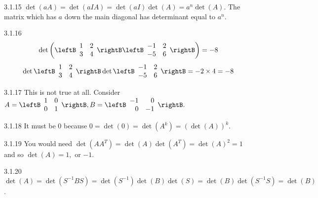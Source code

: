 \begin{Answer}{3.1.15}
$\det \left( aA\right) =\det
\left( aIA\right) =\det \left( aI\right) \det \left( A\right) =a^{n}\det
\left( A\right) .$ The matrix which has $a$ down the main diagonal has
determinant equal to $a^{n}$.
\end{Answer}
\begin{Answer}{3.1.16}
\[
\det
\left( \leftB
\begin{array}{cc}
1 & 2 \\
3 & 4
\end{array}
\rightB \leftB
\begin{array}{rr}
-1 & 2 \\
-5 & 6
\end{array}
\rightB \right) = -8
\]
\[
\det \leftB
\begin{array}{cc}
1 & 2 \\
3 & 4
\end{array}
\rightB \det \leftB
\begin{array}{rr}
-1 & 2 \\
-5 & 6
\end{array}
\rightB = -2 \times 4 = -8
\]
\end{Answer}
\begin{Answer}{3.1.17}
This is not true at all. Consider $A=\leftB
\begin{array}{cc}
1 & 0 \\
0 & 1
\end{array}
\rightB ,B=\leftB
\begin{array}{rr}
-1 & 0 \\
0 & -1
\end{array}
\rightB .$
\end{Answer}
\begin{Answer}{3.1.18}
It must
be 0 because $0=\det \left( 0\right) =\det \left( A^{k}\right) =\left( \det
\left( A\right) \right) ^{k}.$
\end{Answer}
\begin{Answer}{3.1.19}
You would need $\det \left( AA^{T}\right) =\det
\left( A\right) \det \left( A^{T}\right) =\det \left( A\right) ^{2}=1$ and
so $\det \left( A\right) =1,$ or $-1$.
\end{Answer}
\begin{Answer}{3.1.20}
$\det \left( A\right) =\det
\left( S^{-1}BS\right) =\det \left( S^{-1}\right) \det \left( B\right) \det
\left( S\right) =\det \left( B\right) \det \left( S^{-1}S\right) =\det
\left( B\right) $.
\end{Answer}
